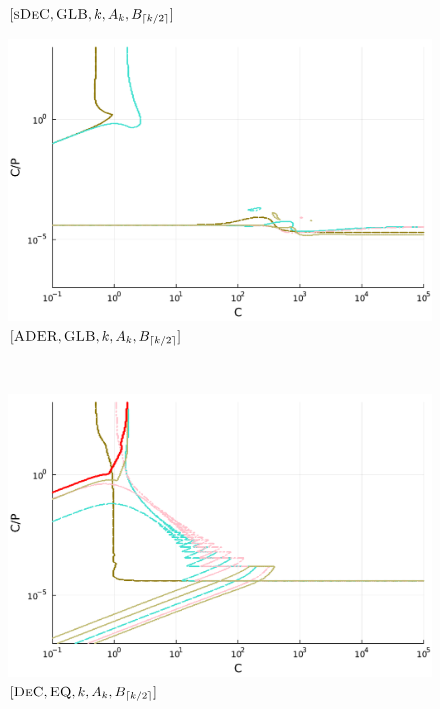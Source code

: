 \begin{figure}
\begin{minipage}[t]{0.32\textwidth}
		\small$[\textsc{sDeC}, \textsc{GLB},k, A_k,B_{\lceil k/2 \rceil}]$\par
	\end{minipage}
	\begin{minipage}[t]{0.32\textwidth}
		\centering
		\includegraphics[width=\textwidth]{pdf/pdepics/disp/IMEXADER_gaussLobatto_disp_all_2-6_newE.pdf}
		\small$[\textsc{ADER}, \textsc{GLB},k, A_k,B_{\lceil k/2 \rceil}]$\par
	\end{minipage}\\
	\begin{minipage}[t]{0.32\textwidth}
		\centering
		\includegraphics[width=\textwidth]{pdf/pdepics/disp/IMEXDeC_equispaced_disp_all_2-6_newE.pdf}
		\small$[\textsc{DeC}, \textsc{EQ},k,A_k,B_{\lceil k/2 \rceil}]$\par
	\end{minipage}
	\begin{minipage}[t]{0.32\textwidth}

\end{minipage}
\end{figure}
